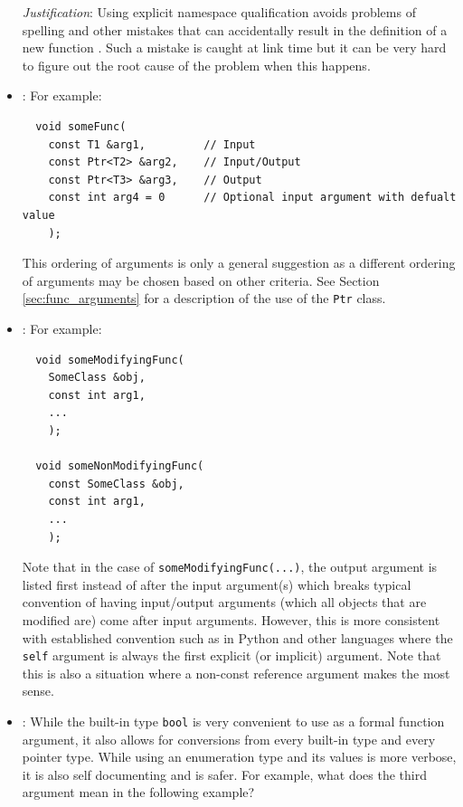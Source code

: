 \begin{itemize}
{}\textit{Justification}: Using explicit namespace qualification avoids
problems of spelling and other mistakes that can accidentally result in the
definition of a new function {}\cite[Section 8.2]{stroustrup97}.  Such a
mistake is caught at link time but it can be very hard to figure out the root
cause of the problem when this happens.

{}\item\GCGFuncArgsOrder: For example:

{\small\begin{verbatim}
  void someFunc(
    const T1 &arg1,         // Input
    const Ptr<T2> &arg2,    // Input/Output
    const Ptr<T3> &arg3,    // Output
    const int arg4 = 0      // Optional input argument with defualt value
    );
\end{verbatim}}

This ordering of arguments is only a general suggestion as a different
ordering of arguments may be chosen based on other criteria.  See Section
{}\ref{sec:func_arguments} for a description of the use of the {}\texttt{Ptr}
class.

{}\item\GCGNomemberObjectFuncs: For example:

{\small\begin{verbatim}
  void someModifyingFunc(
    SomeClass &obj,
    const int arg1,
    ...
    );

  void someNonModifyingFunc(
    const SomeClass &obj,
    const int arg1,
    ...
    );
\end{verbatim}}

Note that in the case of {}\texttt{someModifyingFunc(...)}, the output
argument is listed first instead of after the input argument(s) which breaks
typical convention of having input/output arguments (which all objects that
are modified are) come after input arguments.  However, this is more
consistent with established convention such as in Python and other languages
where the {}\texttt{self} argument is always the first explicit (or implicit)
argument.  Note that this is also a situation where a non-const reference
argument makes the most sense.

{}\item\GCGEnumFuncArgs: While the built-in type {}\texttt{bool} is very convenient
to use as a formal function argument, it also allows for conversions from
every built-in type and every pointer type.  While using an enumeration type
and its values is more verbose, it is also self documenting and is safer.  For
example, what does the third argument mean in the following example?


\end{itemize}

